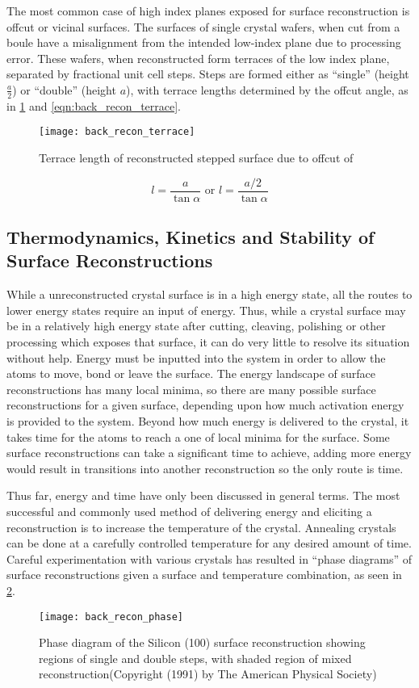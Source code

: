 The most common case of high index planes exposed for surface reconstruction is offcut or vicinal surfaces. The surfaces of single crystal wafers, when cut from a boule have a misalignment from the intended low-index plane due to processing error. These wafers, when reconstructed form terraces of the low index plane, separated by fractional unit cell steps. Steps are formed either as ``single'' (height \(\frac{a}{2}\)) or ``double'' (height \(a\)), with terrace lengths determined by the offcut angle, as in \cref{fig:back_recon_terrace} and \cref{eqn:back_recon_terrace}.
\begin{figure}
    \centering
    \texttt{[image: back\_recon\_terrace]}
    \caption{\label{fig:back_recon_terrace}Terrace length of reconstructed stepped surface due to offcut of \textalpha}
\end{figure}
\begin{equation}
l = \frac{a}{\tan{\alpha}} \text{ or } l = \frac{a/2}{\tan{\alpha}} \label{eqn:back_recon_terrace}
\end{equation}

\subsection{Thermodynamics, Kinetics and Stability of Surface Reconstructions}
While a unreconstructed crystal surface is in a high energy state, all the routes to lower energy states require an input of energy. Thus, while a crystal surface may be in a relatively high energy state after cutting, cleaving, polishing or other processing which exposes that surface, it can do very little to resolve its situation without help. Energy must be inputted into the system in order to allow the atoms to move, bond or leave the surface. The energy landscape of surface reconstructions has many local minima, so there are many possible surface reconstructions for a given surface, depending upon how much activation energy is provided to the system. Beyond how much energy is delivered to the crystal, it takes time for the atoms to reach a one of local minima for the surface. Some surface reconstructions can take a significant time to achieve, adding more energy would result in transitions into another reconstruction so the only route is time.

Thus far, energy and time have only been discussed in general terms. The most successful and commonly used method of delivering energy and eliciting a reconstruction is to increase the temperature of the crystal. Annealing crystals can be done at a carefully controlled temperature for any desired amount of time. Careful experimentation with various crystals has resulted in ``phase diagrams'' of surface reconstructions given a surface and temperature combination, as seen in \cref{fig:back_recon_phase}.
\begin{figure}
    \centering
    \texttt{[image: back\_recon\_phase]}
    \caption[Silicon surface reconstruction phase diagram]{\label{fig:back_recon_phase}Phase diagram of the Silicon (100) surface reconstruction showing regions of single and double steps, with shaded region of mixed reconstruction\cite{Pehlke1991}(Copyright (1991) by The American Physical Society)}
\end{figure}

